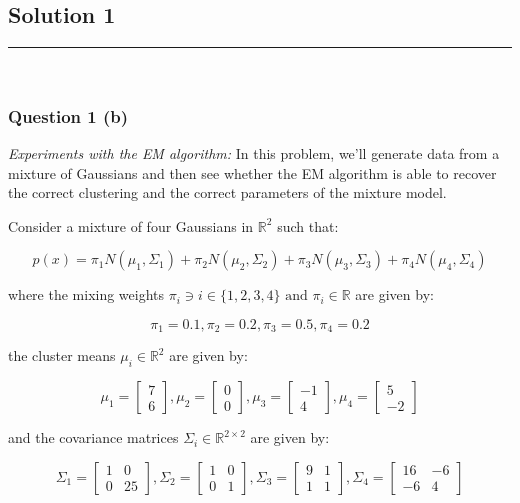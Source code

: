 \documentclass{article}
\begin{document}
\newpage

\subsection*{Solution 1}
\noindent\rule{\textwidth}{0.4pt}\\
\subsubsection*{Question 1 (b)}
\begin{flushleft}
\textit{Experiments with the EM algorithm:} In this problem, we'll generate data from a mixture of Gaussians and then see whether the EM algorithm is able to recover the correct clustering and the correct parameters of the mixture model.
\end{flushleft}
\begin{flushleft}
    Consider a mixture of four Gaussians in $\mathbb{R}^2$ such that:
\end{flushleft}
$$p(x) = \pi_1 N(\mu_1, \Sigma_1) + \pi_2 N(\mu_2, \Sigma_2) + \pi_3 N(\mu_3, \Sigma_3) + \pi_4 N(\mu_4, \Sigma_4)$$
\begin{flushleft}
    where the mixing weights $\pi_i \ni i \in \{1,2,3,4\} \text{ and } \pi_i \in \mathbb{R}$ are given by:
\end{flushleft}
$$\pi_1 = 0.1, \pi_2 = 0.2, \pi_3 = 0.5, \pi_4 = 0.2$$
\begin{flushleft}
    the cluster means $\mu_i \in \mathbb{R}^2$ are given by:
\end{flushleft}
$$\mu_1 = \begin{bmatrix}7 \\ 6\end{bmatrix}, \mu_2 = \begin{bmatrix}0 \\ 0\end{bmatrix}, \mu_3 = \begin{bmatrix}-1 \\ 4\end{bmatrix}, \mu_4 = \begin{bmatrix}5 \\ -2\end{bmatrix}$$
\begin{flushleft}
    and the covariance matrices $\Sigma_i \in \mathbb{R}^{2 \times 2}$ are given by:
\end{flushleft}
$$\Sigma_1 = \begin{bmatrix}1 & 0 \\ 0 & 25\end{bmatrix}, \Sigma_2 = \begin{bmatrix}1 & 0 \\ 0 & 1\end{bmatrix}, \Sigma_3 = \begin{bmatrix}9 & 1 \\ 1 & 1\end{bmatrix}, \Sigma_4 = \begin{bmatrix}16 & -6 \\ -6 & 4\end{bmatrix}$$
\end{document}
